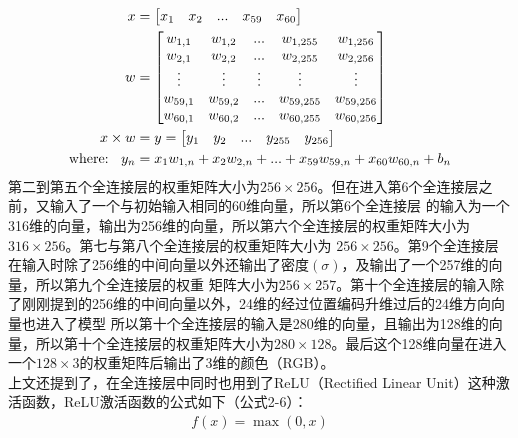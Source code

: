 \documentclass{nwputhesis}
\begin{document}
\begin{equation}
    \begin{aligned}
        x &= \begin{bmatrix}
            x_1 & x_2 & ... & x_{59} & x_{60}
        \end{bmatrix}
        \\
        w &=
            \begin{bmatrix}
                    w_{1,1} & w_{1,2} & ... & w_{1,255} & w_{1,256}\\
                    w_{2,1} & w_{2,2} & ... & w_{2,255} & w_{2,256}\\
                    \vdots & \vdots & \vdots & \vdots & \vdots\\
                    w_{59,1} & w_{59,2} & ... & w_{59,255} & w_{59,256}\\
                    w_{60,1} & w_{60,2} & ... & w_{60,255} & w_{60,256}\\
            \end{bmatrix}
        \\
        x \times w &= y = \begin{bmatrix}
            y_1 & y_2 & ... & y_{255} & y_{256}
        \end{bmatrix}
        \\
        \text{where: \space} y_n &= x_1w_{1,n} + x_2w_{2,n} + ... + x_{59}w_{59,n} + x_{60}w_{60,n} + b_n 
    \end{aligned}
\end{equation}
\indent
第二到第五个全连接层的权重矩阵大小为$256 \times 256$。但在进入第6个全连接层之前，又输入了一个与初始输入相同的60维向量，所以第6个全连接层
的输入为一个316维的向量，输出为256维的向量，所以第六个全连接层的权重矩阵大小为$316 \times 256$。第七与第八个全连接层的权重矩阵大小为
$256 \times 256$。第9个全连接层在输入时除了256维的中间向量以外还输出了密度$(\sigma)$，及输出了一个257维的向量，所以第九个全连接层的权重
矩阵大小为$256 \times 257$。第十个全连接层的输入除了刚刚提到的256维的中间向量以外，24维的经过位置编码升维过后的24维方向向量也进入了模型
所以第十个全连接层的输入是280维的向量，且输出为128维的向量，所以第十个全连接层的权重矩阵大小为$280 \times 128$。最后这个128维向量在进入
一个$128 \times 3$的权重矩阵后输出了3维的颜色（RGB）。
\\
\indent
上文还提到了，在全连接层中同时也用到了ReLU（Rectified Linear Unit）这种激活函数，ReLU激活函数的公式如下（公式2-6）：
\begin{equation}
    \begin{aligned}
        f(x) = \max(0,x)
    \end{aligned}
\end{equation}
\end{document}
